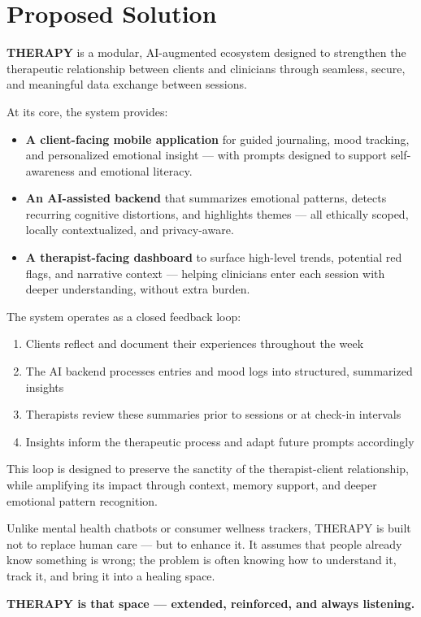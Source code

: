 \section{Proposed Solution}

\textbf{THERAPY} is a modular, AI-augmented ecosystem designed to strengthen the therapeutic relationship between clients and clinicians through seamless, secure, and meaningful data exchange between sessions.

At its core, the system provides:

\begin{itemize}
  \item \textbf{A client-facing mobile application}  
    for guided journaling, mood tracking, and personalized emotional insight — with prompts designed to support self-awareness and emotional literacy.

  \item \textbf{An AI-assisted backend}  
    that summarizes emotional patterns, detects recurring cognitive distortions, and highlights themes — all ethically scoped, locally contextualized, and privacy-aware.

  \item \textbf{A therapist-facing dashboard}  
    to surface high-level trends, potential red flags, and narrative context — helping clinicians enter each session with deeper understanding, without extra burden.
\end{itemize}

\bigskip

\noindent The system operates as a closed feedback loop:

\begin{enumerate}
  \item Clients reflect and document their experiences throughout the week
  \item The AI backend processes entries and mood logs into structured, summarized insights
  \item Therapists review these summaries prior to sessions or at check-in intervals
  \item Insights inform the therapeutic process and adapt future prompts accordingly
\end{enumerate}

\bigskip

\noindent This loop is designed to preserve the sanctity of the therapist-client relationship, while amplifying its impact through context, memory support, and deeper emotional pattern recognition.

\bigskip

Unlike mental health chatbots or consumer wellness trackers, THERAPY is built not to replace human care — but to enhance it. It assumes that people already know something is wrong; the problem is often knowing how to understand it, track it, and bring it into a healing space.

\bigskip

\textbf{THERAPY is that space — extended, reinforced, and always listening.}
